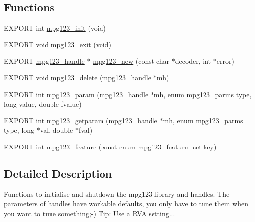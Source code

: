 \subsection*{Functions}
\begin{DoxyCompactItemize}
\item 
E\+X\+P\+O\+RT int \hyperlink{group__mpg123__init_ga2d00303745f1e30a8ffedd2c63d94183}{mpg123\+\_\+init} (void)
\item 
E\+X\+P\+O\+RT void \hyperlink{group__mpg123__init_ga596b2d57d7b63345cf91909d81205a2a}{mpg123\+\_\+exit} (void)
\item 
E\+X\+P\+O\+RT \hyperlink{group__mpg123__init_ga6728e2839a395f3a07d4514da659faca}{mpg123\+\_\+handle} $\ast$ \hyperlink{group__mpg123__init_gabe8db4b9a52616d1da89c17a85b99afe}{mpg123\+\_\+new} (const char $\ast$decoder, int $\ast$error)
\item 
E\+X\+P\+O\+RT void \hyperlink{group__mpg123__init_ga3037431a72fb61f69abc588ee640ae20}{mpg123\+\_\+delete} (\hyperlink{group__mpg123__init_ga6728e2839a395f3a07d4514da659faca}{mpg123\+\_\+handle} $\ast$mh)
\item 
E\+X\+P\+O\+RT int \hyperlink{group__mpg123__init_ga4496c0fc5c1f9dc141a0090a640e5857}{mpg123\+\_\+param} (\hyperlink{group__mpg123__init_ga6728e2839a395f3a07d4514da659faca}{mpg123\+\_\+handle} $\ast$mh, enum \hyperlink{group__mpg123__init_ga73a8ff3363028b89afc72b3ea032b9cb}{mpg123\+\_\+parms} type, long value, double fvalue)
\item 
E\+X\+P\+O\+RT int \hyperlink{group__mpg123__init_ga7d8cc88f00db97b26aa237a53f6179fe}{mpg123\+\_\+getparam} (\hyperlink{group__mpg123__init_ga6728e2839a395f3a07d4514da659faca}{mpg123\+\_\+handle} $\ast$mh, enum \hyperlink{group__mpg123__init_ga73a8ff3363028b89afc72b3ea032b9cb}{mpg123\+\_\+parms} type, long $\ast$val, double $\ast$fval)
\item 
E\+X\+P\+O\+RT int \hyperlink{group__mpg123__init_ga1f2d38c15bd586f625e24dab1d7710e9}{mpg123\+\_\+feature} (const enum \hyperlink{group__mpg123__init_gab26f1b8c3289847f5928176a20b4c942}{mpg123\+\_\+feature\+\_\+set} key)
\end{DoxyCompactItemize}


\subsection{Detailed Description}
Functions to initialise and shutdown the mpg123 library and handles. The parameters of handles have workable defaults, you only have to tune them when you want to tune something;-\/) Tip\+: Use a R\+VA setting... 

